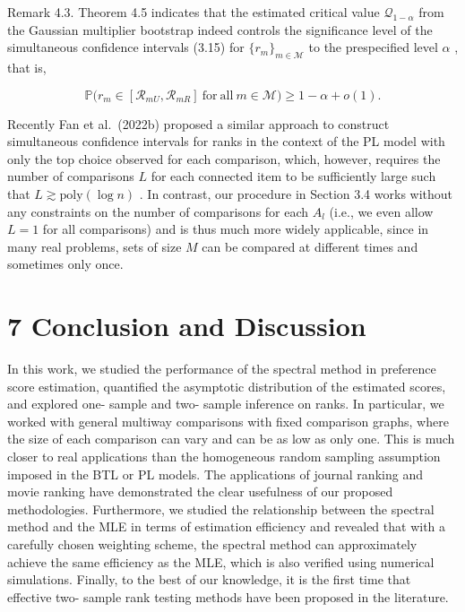 Remark 4.3. Theorem 4.5 indicates that the estimated critical value
\(\mathcal{Q}_{1 - \alpha}\) from the Gaussian multiplier bootstrap
indeed controls the significance level of the simultaneous confidence
intervals (3.15) for \(\{r_m\}_{m\in \mathcal{M}}\) to the prespecified
level \(\alpha\) , that is,

\[
\mathbb{P}\Big(r_{m}\in [\mathcal{R}_{mU},\mathcal{R}_{mR}]\mathrm{~for~all~}m\in \mathcal{M}\Big)\geq 1 - \alpha +o(1).
\]

Recently Fan et al.~(2022b) proposed a similar approach to construct
simultaneous confidence intervals for ranks in the context of the PL
model with only the top choice observed for each comparison, which,
however, requires the number of comparisons \(L\) for each connected
item to be sufficiently large such that
\(L\gtrsim \mathrm{poly}(\log n)\) . In contrast, our procedure in
Section 3.4 works without any constraints on the number of comparisons
for each \(A_{l}\) (i.e., we even allow \(L = 1\) for all comparisons)
and is thus much more widely applicable, since in many real problems,
sets of size \(M\) can be compared at different times and sometimes only
once.

\section{7 Conclusion and Discussion}\label{conclusion-and-discussion}

In this work, we studied the performance of the spectral method in
preference score estimation, quantified the asymptotic distribution of
the estimated scores, and explored one- sample and two- sample inference
on ranks. In particular, we worked with general multiway comparisons
with fixed comparison graphs, where the size of each comparison can vary
and can be as low as only one. This is much closer to real applications
than the homogeneous random sampling assumption imposed in the BTL or PL
models. The applications of journal ranking and movie ranking have
demonstrated the clear usefulness of our proposed methodologies.
Furthermore, we studied the relationship between the spectral method and
the MLE in terms of estimation efficiency and revealed that with a
carefully chosen weighting scheme, the spectral method can approximately
achieve the same efficiency as the MLE, which is also verified using
numerical simulations. Finally, to the best of our knowledge, it is the
first time that effective two- sample rank testing methods have been
proposed in the literature.

